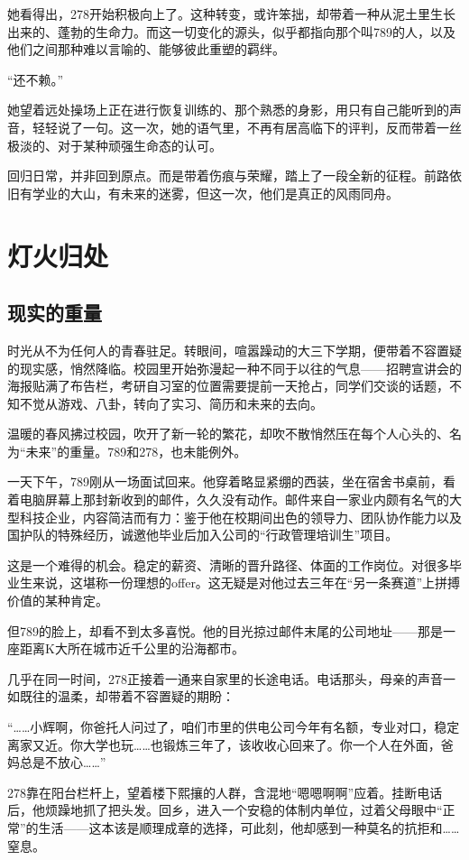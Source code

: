 \documentclass[a4paper]{book}
\begin{document}
她看得出，278开始积极向上了。这种转变，或许笨拙，却带着一种从泥土里生长出来的、蓬勃的生命力。而这一切变化的源头，似乎都指向那个叫789的人，以及他们之间那种难以言喻的、能够彼此重塑的羁绊。

“还不赖。”

她望着远处操场上正在进行恢复训练的、那个熟悉的身影，用只有自己能听到的声音，轻轻说了一句。这一次，她的语气里，不再有居高临下的评判，反而带着一丝极淡的、对于某种顽强生命态的认可。

回归日常，并非回到原点。而是带着伤痕与荣耀，踏上了一段全新的征程。前路依旧有学业的大山，有未来的迷雾，但这一次，他们是真正的风雨同舟。
\newpage
\chapter{灯火归处}
\normalsize
\section{现实的重量}
\songti{}
时光从不为任何人的青春驻足。转眼间，喧嚣躁动的大三下学期，便带着不容置疑的现实感，悄然降临。校园里开始弥漫起一种不同于以往的气息——招聘宣讲会的海报贴满了布告栏，考研自习室的位置需要提前一天抢占，同学们交谈的话题，不知不觉从游戏、八卦，转向了实习、简历和未来的去向。

温暖的春风拂过校园，吹开了新一轮的繁花，却吹不散悄然压在每个人心头的、名为“未来”的重量。789和278，也未能例外。

一天下午，789刚从一场面试回来。他穿着略显紧绷的西装，坐在宿舍书桌前，看着电脑屏幕上那封新收到的邮件，久久没有动作。邮件来自一家业内颇有名气的大型科技企业，内容简洁而有力：鉴于他在校期间出色的领导力、团队协作能力以及国护队的特殊经历，诚邀他毕业后加入公司的“行政管理培训生”项目。

这是一个难得的机会。稳定的薪资、清晰的晋升路径、体面的工作岗位。对很多毕业生来说，这堪称一份理想的offer。这无疑是对他过去三年在“另一条赛道”上拼搏价值的某种肯定。

但789的脸上，却看不到太多喜悦。他的目光掠过邮件末尾的公司地址——那是一座距离K大所在城市近千公里的沿海都市。

几乎在同一时间，278正接着一通来自家里的长途电话。电话那头，母亲的声音一如既往的温柔，却带着不容置疑的期盼：

“……小辉啊，你爸托人问过了，咱们市里的供电公司今年有名额，专业对口，稳定离家又近。你大学也玩……也锻炼三年了，该收收心回来了。你一个人在外面，爸妈总是不放心……”

278靠在阳台栏杆上，望着楼下熙攘的人群，含混地“嗯嗯啊啊”应着。挂断电话后，他烦躁地抓了把头发。回乡，进入一个安稳的体制内单位，过着父母眼中“正常”的生活——这本该是顺理成章的选择，可此刻，他却感到一种莫名的抗拒和……窒息。
\end{document}
